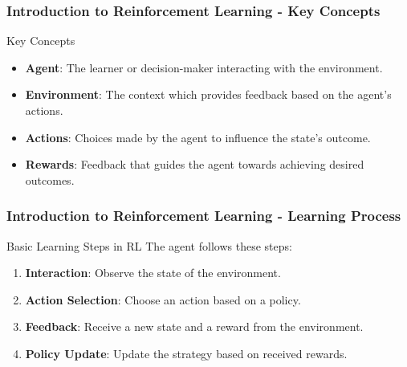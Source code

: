 \documentclass{beamer}
\begin{document}
\begin{frame}[fragile]
    \frametitle{Introduction to Reinforcement Learning - Key Concepts}

    \begin{block}{Key Concepts}
        \begin{itemize}
            \item \textbf{Agent}: The learner or decision-maker interacting with the environment.
            \item \textbf{Environment}: The context which provides feedback based on the agent's actions.
            \item \textbf{Actions}: Choices made by the agent to influence the state's outcome.
            \item \textbf{Rewards}: Feedback that guides the agent towards achieving desired outcomes.
        \end{itemize}
    \end{block}

\end{frame}

\begin{frame}[fragile]
    \frametitle{Introduction to Reinforcement Learning - Learning Process}
    
    \begin{block}{Basic Learning Steps in RL}
        The agent follows these steps:
    \end{block}
    
    \begin{enumerate}
        \item \textbf{Interaction}: Observe the state of the environment.
        \item \textbf{Action Selection}: Choose an action based on a policy.
        \item \textbf{Feedback}: Receive a new state and a reward from the environment.
        \item \textbf{Policy Update}: Update the strategy based on received rewards.
    \end{enumerate}

\end{frame}
\end{document}
